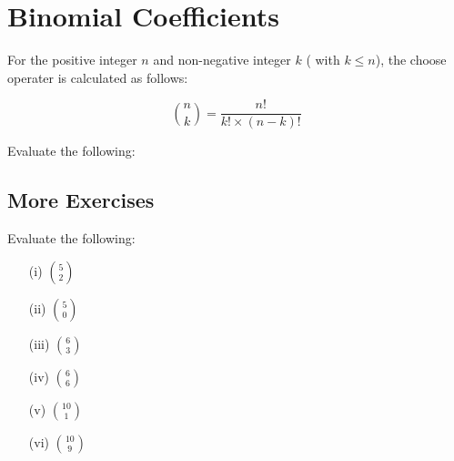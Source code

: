 \documentclass[]{report}
\begin{document}
\section{Binomial Coefficients}

For the positive integer $n$ and non-negative integer $k$ ( with $k\leq n$), the choose operater is calculated as follows:

\[ {n \choose k} = \frac{n!}{k! \times (n-k)!} \]





Evaluate the following:
		\subsection*{More Exercises}				
		Evaluate the following:
		\begin{multicols}{3}
			\begin{enumerate}
				\item[(i)] ${5 \choose 2}$
				\item[(ii)] ${5 \choose 0}$
				\item[(iii)] ${6 \choose 3}$
				\item[(iv)] ${6 \choose 6}$
				\item[(v)] ${10 \choose 1}$
				\item[(vi)] ${10 \choose 9}$
			\end{enumerate}        
		\end{multicols}	
\end{document}
